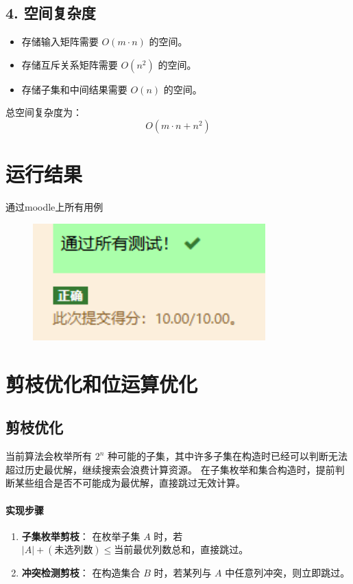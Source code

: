 \documentclass[UTF8]{ctexart}
\begin{document}
\subsection*{4. 空间复杂度}
\begin{itemize}
    \item 存储输入矩阵需要 $O(m \cdot n)$ 的空间。
    \item 存储互斥关系矩阵需要 $O(n^2)$ 的空间。
    \item 存储子集和中间结果需要 $O(n)$ 的空间。
\end{itemize}
总空间复杂度为：
\[
O(m \cdot n + n^2)
\]

\section{运行结果}
通过moodle上所有用例
\begin{figure}[htbp]
    \centering
    \includegraphics[width=0.8\textwidth]{moodle.png}
\end{figure}

\section*{剪枝优化和位运算优化}

\subsection{剪枝优化}
当前算法会枚举所有 $2^n$ 种可能的子集，其中许多子集在构造时已经可以判断无法超过历史最优解，继续搜索会浪费计算资源。
在子集枚举和集合构造时，提前判断某些组合是否不可能成为最优解，直接跳过无效计算。

\paragraph{实现步骤}
\begin{enumerate}
    \item \textbf{子集枚举剪枝}：
    在枚举子集 $A$ 时，若 $|A| + (\text{未选列数}) \leq \text{当前最优列数总和}$，直接跳过。
    \item \textbf{冲突检测剪枝}：
    在构造集合 $B$ 时，若某列与 $A$ 中任意列冲突，则立即跳过。
\end{enumerate}
\end{document}
